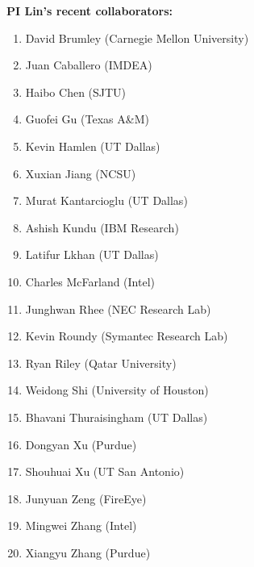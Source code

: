 \vspace{0.2in}
\noindent \textbf{PI Lin's recent collaborators:}
\begin{enumerate}
\item David Brumley (Carnegie Mellon University)
\item Juan Caballero (IMDEA)
\item Haibo Chen (SJTU)
\item Guofei Gu (Texas A\&M)
\item Kevin Hamlen (UT Dallas)
\item Xuxian Jiang (NCSU)
\item Murat Kantarcioglu (UT Dallas)
\item Ashish Kundu (IBM Research)
\item Latifur Lkhan (UT Dallas)
\item Charles McFarland (Intel)
\item Junghwan Rhee (NEC Research Lab)
\item Kevin Roundy (Symantec Research Lab)
\item Ryan Riley (Qatar University)
\item Weidong Shi  (University of Houston)
\item Bhavani Thuraisingham (UT Dallas)
\item Dongyan Xu (Purdue)
\item Shouhuai Xu (UT San Antonio)
\item Junyuan Zeng (FireEye)
\item Mingwei Zhang (Intel)
\item Xiangyu Zhang (Purdue)
\end{enumerate}


 